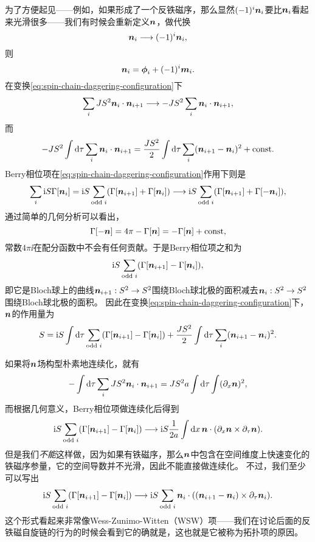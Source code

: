 为了方便起见——例如，如果形成了一个反铁磁序，那么显然$(-1)^i \vb*{n}_i$要比$\vb*{n}_i$看起来光滑很多——我们有时候会重新定义$\vb*{n}$，做代换
\begin{equation}
    \vb*{n}_i \longrightarrow (-1)^i \vb*{n}_i,
    \label{eq:spin-chain-daggering-configuration}
\end{equation}
则
\begin{equation}
    \vb*{n}_i = \vb*{\phi}_i + (-1)^i \vb*{m}_i.
    \label{eq:spin-chain-afm-decomposition-after-staggering}
\end{equation}
在变换\eqref{eq:spin-chain-daggering-configuration}下
\[
    \sum_i JS^2 \vb*{n}_i \cdot \vb*{n}_{i+1} \longrightarrow - JS^2 \sum_i \vb*{n}_i \cdot \vb*{n}_{i+1},
\]
而
\[
    - JS^2 \int \dd{\tau} \sum_i \vb*{n}_i \cdot \vb*{n}_{i+1} = \frac{JS^2}{2} \int \dd{\tau} \sum_i (\vb*{n}_{i+1} - \vb*{n}_i)^2 + \mathrm{const}.
\]
Berry相位项在\eqref{eq:spin-chain-daggering-configuration}作用下则是
\[
    \sum_i \mathrm{i} S \Gamma[\vb*{n}_i] = \mathrm{i} S \sum_{\text{odd $i$}} (\Gamma[\vb*{n}_{i+1}] + \Gamma[\vb*{n}_i]) \longrightarrow \mathrm{i} S \sum_{\text{odd $i$}} (\Gamma[\vb*{n}_{i+1}] + \Gamma[-\vb*{n}_i]) ,
\]
通过简单的几何分析可以看出，
\begin{equation}
    \Gamma[-\vb*{n}] = 4 \pi - \Gamma[\vb*{n}] = - \Gamma[\vb*{n}] + \mathrm{const},
\end{equation}
常数$4 \pi \ii$在配分函数中不会有任何贡献。于是Berry相位项之和为
\[
    \mathrm{i} S \sum_\text{odd $i$} (\Gamma[\vb*{n}_{i+1}] - \Gamma[\vb*{n}_i]),
\]
即它是Bloch球上的曲线$\vb*{n}_{i+1}: S^2 \to S^2$围绕Bloch球北极的面积减去$\vb*{n}_i : S^2 \to S^2$围绕Bloch球北极的面积。
因此在变换\eqref{eq:spin-chain-daggering-configuration}下，$\vb*{n}$的作用量为
\begin{equation}
    S = \mathrm{i} S \int \dd{\tau} \sum_\text{odd $i$} (\Gamma[\vb*{n}_{i+1}] - \Gamma[\vb*{n}_i]) + \frac{JS^2}{2} \int \dd{\tau} \sum_i (\vb*{n}_{i+1} - \vb*{n}_i)^2.
    \label{eq:discrete-heisenberg-spin-chain-action}
\end{equation}

如果将$\vb*{n}$场构型朴素地连续化，就有
\[
    - \int \dd{\tau} \sum_i JS^2 \vb*{n}_i \cdot \vb*{n}_{i+1} = JS^2 a \int \dd{\tau} \int (\partial_x {\vb*{n}})^2,
\]
而根据几何意义，Berry相位项做连续化后得到
\[
    {\mathrm{i} S} \sum_{\text{odd $i$}} (\Gamma[\vb*{n}_{i+1}] - \Gamma[\vb*{n}_i]) \longrightarrow \mathrm{i} S \frac{1}{2a} \int \dd{x} \vb*{n} \cdot (\partial_x \vb*{n} \times \partial_\tau \vb*{n}). 
\]
但是我们\emph{不能}这样做，因为如果有铁磁序，那么$\vb*{n}$中包含在空间维度上快速变化的铁磁序参量，它的空间导数并不光滑，因此不能直接做连续化。
不过，我们至少可以写出
\begin{equation}
    {\mathrm{i}S} \sum_{\text{odd $i$}} (\Gamma[\vb*{n}_{i+1}] - \Gamma[\vb*{n}_i]) \longrightarrow \mathrm{i} S \sum_\text{odd $i$} \vb*{n}_i \cdot ((\vb*{n}_{i+1} - \vb*{n}_i) \times \partial_\tau \vb*{n}_i). 
\end{equation}
这个形式看起来非常像Wess-Zunimo-Witten（WSW）项——我们在讨论后面的反铁磁自旋链的行为的时候会看到它的确就是，这也就是它被称为拓扑项的原因。

